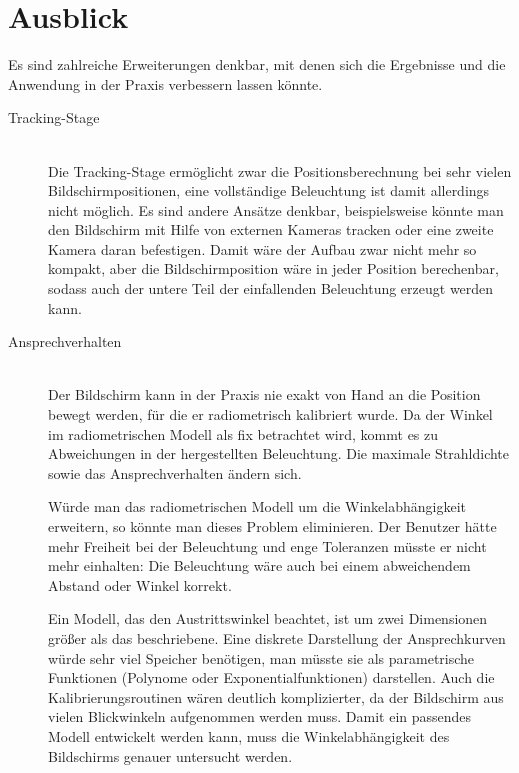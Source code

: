    
 \section*{Ausblick}
   
  
  Es sind zahlreiche Erweiterungen denkbar, mit denen sich die Ergebnisse und die Anwendung in der Praxis verbessern lassen könnte.
\begin{description}
  \item[Tracking-Stage] \hfill \\     
    Die Tracking-Stage ermöglicht zwar die Positionsberechnung bei sehr vielen Bildschirmpositionen, eine vollständige Beleuchtung ist damit allerdings nicht möglich.
    Es sind andere Ansätze denkbar, beispielsweise könnte man den Bildschirm mit Hilfe von externen Kameras tracken oder eine zweite Kamera daran befestigen.
    Damit wäre der Aufbau zwar nicht mehr so kompakt, aber die Bildschirmposition wäre in jeder Position berechenbar, sodass auch der untere Teil der einfallenden Beleuchtung erzeugt werden kann.
   
  \item[Ansprechverhalten] \hfill \\ 
    Der Bildschirm kann in der Praxis nie exakt von Hand an die Position bewegt werden, für die er radiometrisch kalibriert wurde.
    Da der Winkel im radiometrischen Modell als fix betrachtet wird, kommt es zu Abweichungen in der hergestellten Beleuchtung.
    Die maximale Strahldichte sowie das Ansprechverhalten ändern sich.
    
    Würde man das  radiometrischen Modell um die Winkelabhängigkeit erweitern, so könnte man dieses Problem eliminieren.
    Der Benutzer hätte mehr Freiheit bei der Beleuchtung und enge Toleranzen müsste er nicht mehr einhalten: 
      Die Beleuchtung wäre auch bei einem abweichendem Abstand oder Winkel korrekt.
          
    Ein Modell, das den Austrittswinkel beachtet, ist um zwei Dimensionen  größer als das beschriebene.
    Eine diskrete Darstellung der Ansprechkurven würde sehr viel Speicher benötigen, man müsste sie als parametrische Funktionen (Polynome oder Exponentialfunktionen) darstellen. 
    Auch die Kalibrierungsroutinen wären deutlich komplizierter, da der Bildschirm aus vielen Blickwinkeln aufgenommen werden muss.
    Damit ein passendes Modell entwickelt werden kann, muss die Winkelabhängigkeit des Bildschirms genauer untersucht werden.
    

\end{description}
